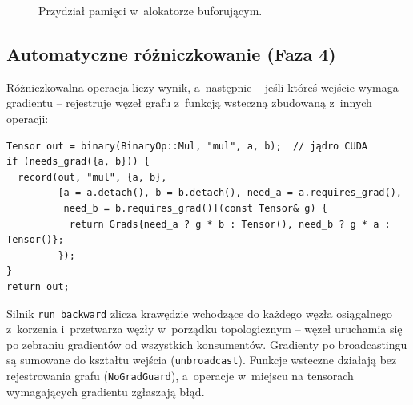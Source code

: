 \documentclass[11pt,a4paper]{article}
\begin{document}
\begin{figure}[H]
\centering
{}
\caption{Przydział pamięci w~alokatorze buforującym.}
\label{fig:alloc}
\end{figure}

\subsection{Automatyczne różniczkowanie (Faza 4)}

Różniczkowalna operacja liczy wynik, a~następnie -- jeśli któreś wejście wymaga
gradientu -- rejestruje węzeł grafu z~funkcją wsteczną zbudowaną z~innych operacji:

\begin{lstlisting}[style=cpp]
Tensor out = binary(BinaryOp::Mul, "mul", a, b);  // jądro CUDA
if (needs_grad({a, b})) {
  record(out, "mul", {a, b},
         [a = a.detach(), b = b.detach(), need_a = a.requires_grad(),
          need_b = b.requires_grad()](const Tensor& g) {
           return Grads{need_a ? g * b : Tensor(), need_b ? g * a : Tensor()};
         });
}
return out;
\end{lstlisting}

Silnik \texttt{run\_backward} zlicza krawędzie wchodzące do każdego węzła osiągalnego
z~korzenia i~przetwarza węzły w~porządku topologicznym -- węzeł uruchamia się po zebraniu
gradientów od wszystkich konsumentów. Gradienty po broadcastingu są sumowane do kształtu
wejścia (\texttt{unbroadcast}). Funkcje wsteczne działają bez rejestrowania grafu
(\texttt{NoGradGuard}), a~operacje w~miejscu na tensorach wymagających gradientu zgłaszają
błąd.
\end{document}
